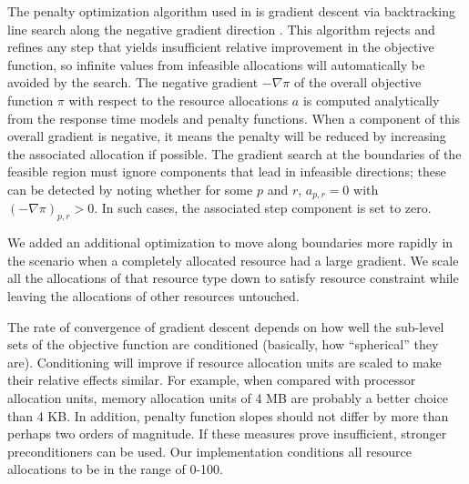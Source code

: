 The penalty optimization algorithm used in \pacora is gradient descent via backtracking line search along the negative gradient direction \cite{BoVa}.
This algorithm rejects and refines any step that yields insufficient relative improvement in the objective function,
so infinite values from infeasible allocations will automatically be avoided by the search.
The negative gradient $-\nabla\pi$ of the overall objective function $\pi$
with respect to the resource allocations $a$
is computed analytically from the response time models and penalty functions.
When a component of this overall gradient is negative,
it means the penalty will be reduced by increasing the associated allocation if possible.
The gradient search at the boundaries of the feasible region
must ignore components that lead in infeasible directions;
these can be detected by noting whether for some $p$ and $r$, $a_{p,r} = 0$ with $(-\nabla\pi)_{p,r} > 0$.
In such cases, the associated step component is set to zero.

We added an additional optimization to move along boundaries more rapidly in the scenario when a completely allocated resource had a large gradient.  We scale all the allocations of that resource type down to satisfy resource constraint while leaving the allocations of other resources untouched.

The rate of convergence of gradient descent depends on how well the sub-level sets of the objective function
are conditioned (basically, how ``spherical'' they are).
Conditioning will improve if resource allocation units are scaled to make their relative effects similar.
For example, when compared with processor allocation units,
memory allocation units of 4 MB are probably a better choice than 4 KB.
In addition, penalty function slopes should not differ by more than perhaps two orders of magnitude. If these measures prove insufficient, stronger preconditioners can be used. Our implementation conditions all resource allocations to be in the range of 0-100.




